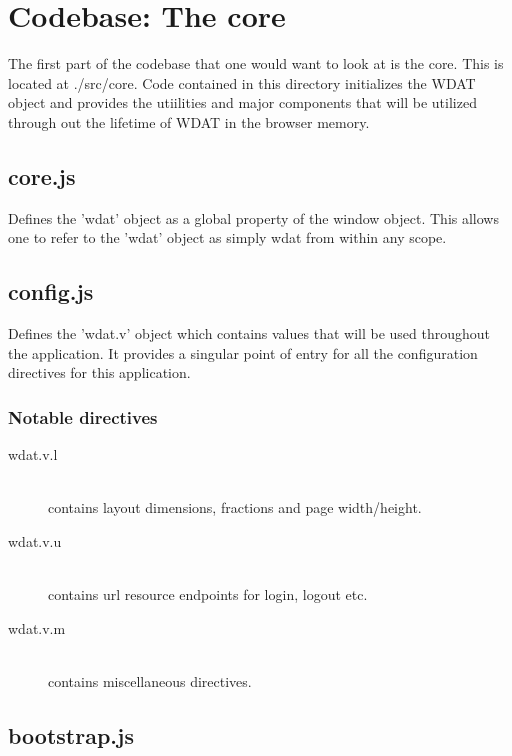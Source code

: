 \chapter{Codebase: The core}

The first part of the codebase that one would want to look at is the
core.  This is located at ./src/core.  Code contained in this
directory initializes the WDAT object and provides the utiilities and
major components that will be utilized through out the lifetime of
WDAT in the browser memory.


\section{core.js}

Defines the 'wdat' object as a global property of the window object.
This allows one to refer to the 'wdat' object as simply wdat from
within any scope.

\section{config.js}

Defines the 'wdat.v' object which contains values that will be used
throughout the application.  It provides a singular point of entry for
all the configuration directives for this application.

\subsection{Notable directives}

\begin{description}
  \item[wdat.v.l]\hfill \\
  contains layout dimensions, fractions and page width/height.

  \item[wdat.v.u]\hfill \\
  contains url resource endpoints for login, logout etc.

  \item[wdat.v.m]\hfill \\
  contains miscellaneous directives.
\end{description}

\section{bootstrap.js}

